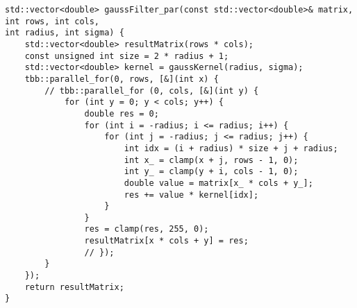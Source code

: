\documentclass{report}
\begin{document}
\begin{lstlisting}
std::vector<double> gaussFilter_par(const std::vector<double>& matrix, int rows, int cols,
int radius, int sigma) {
	std::vector<double> resultMatrix(rows * cols);
	const unsigned int size = 2 * radius + 1;
	std::vector<double> kernel = gaussKernel(radius, sigma);
	tbb::parallel_for(0, rows, [&](int x) {
		// tbb::parallel_for (0, cols, [&](int y) {
			for (int y = 0; y < cols; y++) {
				double res = 0;
				for (int i = -radius; i <= radius; i++) {
					for (int j = -radius; j <= radius; j++) {
						int idx = (i + radius) * size + j + radius;
						int x_ = clamp(x + j, rows - 1, 0);
						int y_ = clamp(y + i, cols - 1, 0);
						double value = matrix[x_ * cols + y_];
						res += value * kernel[idx];
					}
				}
				res = clamp(res, 255, 0);
				resultMatrix[x * cols + y] = res;
				// });
		}
	});
	return resultMatrix;
}

	
\end{lstlisting}
\end{document}
